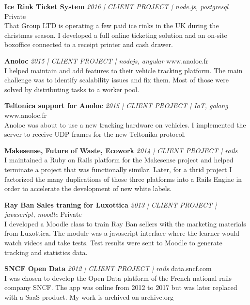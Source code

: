 \documentclass[a4paper]{article}
\begin{document}
{\textbf{Ice Rink Ticket System} \sl 2016 | CLIENT PROJECT | node.js, postgresql} \hfill Private\\
That Group LTD is operating a few paid ice rinks in the UK during the christmas season.
I developed a full online ticketing solution and an on-site boxoffice connected to a receipt printer and cash drawer.
\vspace*{2mm}


{\textbf{Anoloc} \sl 2015 | CLIENT PROJECT | nodejs, angular} \hfill www.anoloc.fr\\
I helped maintain and add features to their vehicle tracking platform.
The main challenge was to identify scalability issues and fix them.
Most of those were solved by distributing tasks to a worker pool.\\
\vspace*{2mm}

{\textbf{Teltonica support for Anoloc} \sl 2015 | CLIENT PROJECT | IoT, golang} \hfill www.anoloc.fr\\
Anoloc was about to use a new tracking hardware on vehicles.
I implemented the server to receive UDP frames for the new Teltonika protocol.
\vspace*{2mm}

{\textbf{Makesense, Future of Waste, Ecowork} \sl 2014 | CLIENT PROJECT | rails} \hfill\\
I maintained a Ruby on Rails platform for the Makesense project and helped terminate a project that was functionally similar.
Later, for a thrid project I factorized the many duplications of those three platforms into a Rails Engine in order
to accelerate the development of new white labels.
\vspace*{2mm}

{\textbf{Ray Ban Sales traning for Luxottica} \sl 2013 | CLIENT PROJECT | javascript, moodle} \hfill Private\\
I developed a Moodle class to train Ray Ban sellers with the marketing materials from Luxottica.
The module was a javascript interface where the learner would watch videos and take tests.
Test results were sent to Moodle to generate tracking and statistics data.\\
\vspace*{2mm}

{\textbf{SNCF Open Data} \sl 2012 | CLIENT PROJECT | rails} \hfill data.sncf.com\\
I was chosen to develop the Open Data platform of the French national rails company SNCF.
The app was online from 2012 to 2017 but was later replaced with a SaaS product.
My work is archived on archive.org\\
\vspace*{2mm}
\end{document}
